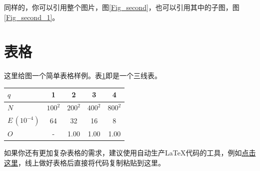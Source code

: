 同样的，你可以引用整个图片，图\ref{Fig_second}，也可以引用其中的子图，图\ref{Fig_second_1}。

\section{表格}
这里给图一个简单表格样例。表\ref{Tab_first}即是一个三线表。
\begin{table}[h]
    \centering
    {
    \begin{tabular}{lcccc}
        \toprule
        $q$ & 1 & 2 & 3 & 4 \\
        \midrule
        $N$ & $100^2$ & $200^2$ & $400^2$ & $800^2$ \\
        $E\,(10^{-4})$ & 64 & 32 & 16 & 8 \\
        $O$ & - & 1.00 & 1.00 & 1.00 \\
        \bottomrule
    \end{tabular}
    }
    \label{Tab_first}
\end{table}

如果你还有更加复杂表格的需求，建议使用自动生产\LaTeX 代码的工具，例如\href{https://www.tablegenerator.com}{点击这里}，线上做好表格后直接将代码复制粘贴到这里。